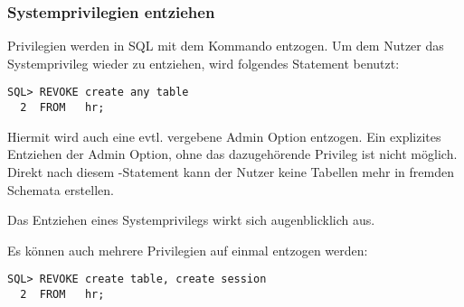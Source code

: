         \subsubsection{Systemprivilegien entziehen}
          Privilegien werden in SQL mit dem Kommando 
          entzogen. Um dem Nutzer  das Systemprivileg
           wieder zu entziehen, wird folgendes
          Statement benutzt:
          \begin{lstlisting}[caption={Entziehen eines
          Privileges},label=admin232,language=oracle_sql]
SQL> REVOKE create any table
  2  FROM   hr;
          \end{lstlisting}
          Hiermit wird auch eine evtl. vergebene Admin Option entzogen. Ein explizites Entziehen der Admin Option, ohne das dazugehörende Privileg ist nicht möglich. Direkt nach diesem -Statement kann der Nutzer  keine Tabellen mehr in fremden Schemata erstellen.
          \begin{merke}
            Das Entziehen eines Systemprivilegs wirkt sich augenblicklich aus.
          \end{merke}
          Es können auch mehrere Privilegien auf einmal entzogen werden:
          \begin{lstlisting}[caption={Entziehen mehrerer
          Privilegien},label=admin234,language=oracle_sql]
SQL> REVOKE create table, create session
  2  FROM   hr;
          \end{lstlisting}
